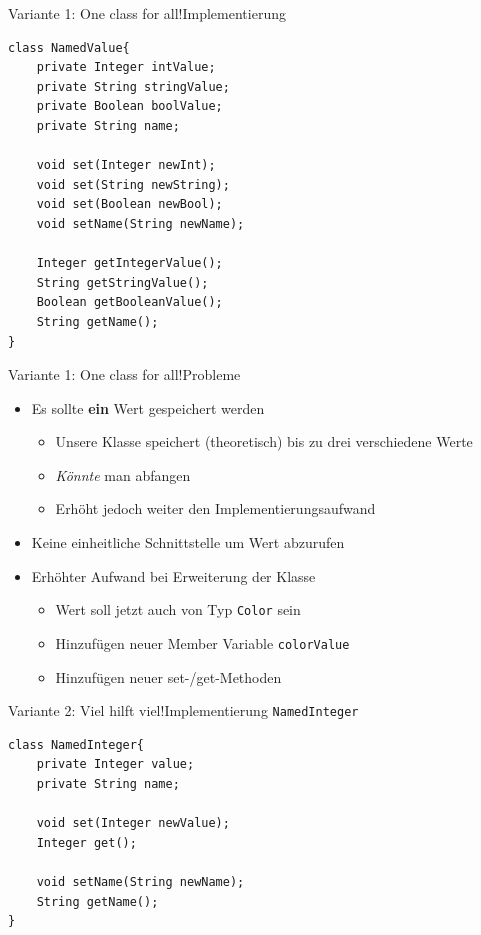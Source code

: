 \begin{frame}[fragile]{Variante 1: One class for all!}{Implementierung}
\lstset{style=javacode}
\begin{lstlisting}
class NamedValue{
    private Integer intValue;
    private String stringValue;
    private Boolean boolValue;
    private String name;

    void set(Integer newInt);
    void set(String newString);
    void set(Boolean newBool);
    void setName(String newName);

    Integer getIntegerValue();
    String getStringValue();
    Boolean getBooleanValue();
    String getName();
}
\end{lstlisting}
\end{frame}

\begin{frame}{Variante 1: One class for all!}{Probleme}
    \begin{itemize}
        \item Es sollte \textbf{ein} Wert gespeichert werden
            \begin{itemize}
                \item Unsere Klasse speichert (theoretisch) bis zu drei verschiedene Werte
                \item \textit{Könnte} man abfangen
                \item Erhöht jedoch weiter den Implementierungsaufwand
            \end{itemize}
            \item Keine einheitliche Schnittstelle um Wert abzurufen
            \item Erhöhter Aufwand bei Erweiterung der Klasse
            \begin{itemize}
                \item Wert soll jetzt auch von Typ \texttt{Color} sein
                \item Hinzufügen neuer Member Variable \texttt{colorValue}
                \item Hinzufügen neuer set-/get-Methoden
            \end{itemize}
    \end{itemize}
\end{frame}

\begin{frame}[fragile]{Variante 2: Viel hilft viel!}{Implementierung \texttt{NamedInteger}}
\lstset{style=javacode}
\begin{lstlisting}
class NamedInteger{
    private Integer value;
    private String name;
    
    void set(Integer newValue);
    Integer get();
    
    void setName(String newName);
    String getName();
}
\end{lstlisting}
\end{frame}


